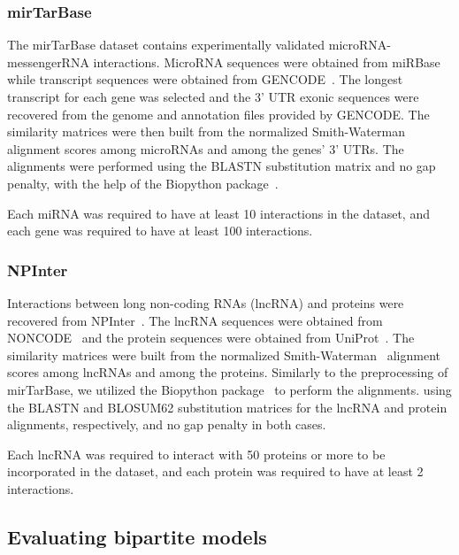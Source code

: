 \subsubsection{mirTarBase}

The mirTarBase dataset contains experimentally validated microRNA-messengerRNA interactions. MicroRNA sequences were obtained from miRBase~\cite{griffiths2006mirbase} while transcript sequences were obtained from GENCODE~\cite{frankish2021gencode}. The longest transcript for each gene was selected and the 3' UTR exonic sequences were recovered from the genome and annotation files provided by GENCODE. The similarity matrices were then built from the normalized Smith-Waterman~\cite{yamanishi2008} alignment scores among microRNAs and among the genes' 3' UTRs. The alignments were performed using the BLASTN substitution matrix and no gap penalty, with the help of the Biopython package~\cite{cock2009biopython}.

Each miRNA was required to have at least 10 interactions in the dataset, and each gene was required to have at least 100 interactions.


\subsubsection{NPInter}

Interactions between long non-coding RNAs (lncRNA) and proteins were recovered from NPInter~\cite{wu2006npinter, teng2020npinter}. The lncRNA sequences were obtained from NONCODE~\cite{zhao2016noncode} and the protein sequences were obtained from UniProt~\cite{uniprot2019}. The similarity matrices were built from the normalized Smith-Waterman~\cite{yamanishi2008} alignment scores among lncRNAs and among the proteins. Similarly to the preprocessing of mirTarBase, we utilized the Biopython package~\cite{cock2009biopython} to perform the alignments. using the BLASTN and BLOSUM62 substitution matrices for the lncRNA and protein alignments, respectively, and no gap penalty in both cases.

Each lncRNA was required to interact with 50 proteins or more to be incorporated in the dataset, and each protein was required to have at least 2 interactions.


\subsection{Evaluating bipartite models}
\label{sec:evaluation_protocol}

